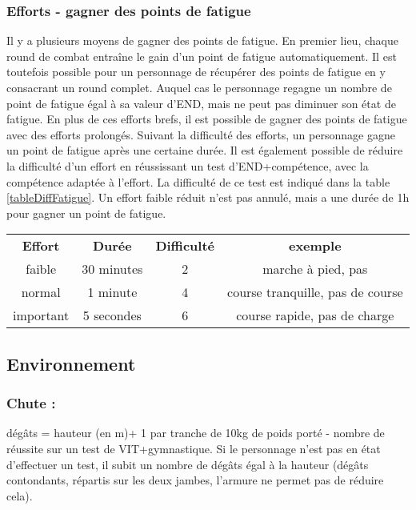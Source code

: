 \documentclass[10pt,a4paper,twocolumn]{book}
\begin{document}
\subsubsection{Efforts - gagner des points de fatigue}
Il y a plusieurs moyens de gagner des points de fatigue.
En premier lieu, chaque round de combat entraîne le gain d’un point de fatigue automatiquement. Il est toutefois possible pour un personnage de récupérer des points de fatigue en y consacrant un round complet. Auquel cas le personnage regagne un nombre de point de fatigue égal à sa valeur d’END, mais ne peut pas diminuer son état de fatigue.
En plus de ces efforts brefs, il est possible de gagner des points de fatigue avec des efforts prolongés.
Suivant la difficulté des efforts, un personnage gagne un point de fatigue après une certaine durée. Il est également possible de réduire la difficulté d’un effort en réussissant un test d’END+compétence, avec la compétence adaptée à l’effort. La difficulté de ce test est indiqué dans la table \ref{tableDiffFatigue}. Un effort faible réduit n’est pas annulé, mais a une durée de 1h pour gagner un point de fatigue.
\begin{table*}
\caption{ Réduire un effort :}
\label{tableDiffFatigue}
\begin{center}
\begin{tabular}{cccc}
\textbf{Effort} & \textbf{Durée} & \textbf{Difficulté} &\textbf{exemple} \\
   faible & 30 minutes & 2  & marche à pied, pas\\
   normal & 1 minute & 4  & course tranquille, pas de course\\
   important & 5 secondes & 6 & course rapide, pas de charge\\
\end{tabular}
\end{center}
\end{table*}

\subsection{Environnement}
\subsubsection{Chute :}
dégâts = hauteur (en m)+ 1 par tranche de 10kg de poids porté - nombre de réussite sur un test de VIT+gymnastique. Si le personnage n’est pas en état d’effectuer un test, il subit un nombre de dégâts égal à la hauteur (dégâts contondants, répartis sur les deux jambes, l'armure ne permet pas de réduire cela).
\end{document}
